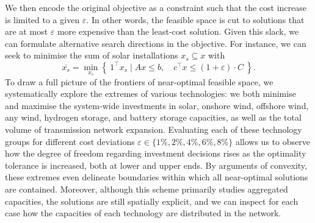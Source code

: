 
We then encode the original objective as a constraint 
such that the cost increase is limited to a given $\varepsilon$.
In other words, the feasible space is cut to solutions that
are at most $\varepsilon$ more expensive than the least-cost solution.
Given this slack, we can formulate alternative search directions in the objective.
For instance, we can seek to minimise the sum of solar installations $x_s \subseteq x$ with
\begin{equation}
    \overline{x_s} = \min_{x_s}\left\{\: 1^\top x_s \mid Ax\leq b,\quad c^\top x\leq (1+\varepsilon)\cdot C \:\right\}.
\end{equation}
To draw a full picture of the frontiers of near-optimal feasible space, 
we systematically explore the extremes of various technologies:
we both minimise and maximise the system-wide investments in
solar, onshore wind, offshore wind, any wind, hydrogen storage, and battery storage
capacities, as well as the total volume of transmission network expansion.
Evaluating each of these technology groups for
different cost deviations $\varepsilon \in \{1\%,2\%,4\%,6\%,8\%\}$
allows us to observe how the degree of freedom regarding investment decisions
rises as the optimality tolerance is increased, both at lower and upper ends.
By arguments of convexity, these extremes even delineate boundaries
within which all near-optimal solutions are contained.
Moreover, although this scheme primarily studies aggregated capacities,
the solutions are still spatially explicit, and we can inspect for each case
how the capacities of each technology are distributed in the network.


